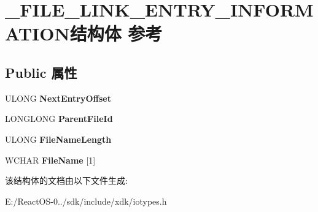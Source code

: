 \hypertarget{struct___f_i_l_e___l_i_n_k___e_n_t_r_y___i_n_f_o_r_m_a_t_i_o_n}{}\section{\+\_\+\+F\+I\+L\+E\+\_\+\+L\+I\+N\+K\+\_\+\+E\+N\+T\+R\+Y\+\_\+\+I\+N\+F\+O\+R\+M\+A\+T\+I\+O\+N结构体 参考}
\label{struct___f_i_l_e___l_i_n_k___e_n_t_r_y___i_n_f_o_r_m_a_t_i_o_n}
\subsection*{Public 属性}
\begin{DoxyCompactItemize}
\item 
\mbox{\label{struct___f_i_l_e___l_i_n_k___e_n_t_r_y___i_n_f_o_r_m_a_t_i_o_n_a804c79ce4b4c49790fd790cfe35675de}} 
U\+L\+O\+NG {\bfseries Next\+Entry\+Offset}
\item 
\mbox{\label{struct___f_i_l_e___l_i_n_k___e_n_t_r_y___i_n_f_o_r_m_a_t_i_o_n_acb264096b24e44b8cf59476f0b30beb0}} 
L\+O\+N\+G\+L\+O\+NG {\bfseries Parent\+File\+Id}
\item 
\mbox{\label{struct___f_i_l_e___l_i_n_k___e_n_t_r_y___i_n_f_o_r_m_a_t_i_o_n_ac4fab2bafc60ef36638d72da5d0d1876}} 
U\+L\+O\+NG {\bfseries File\+Name\+Length}
\item 
\mbox{\label{struct___f_i_l_e___l_i_n_k___e_n_t_r_y___i_n_f_o_r_m_a_t_i_o_n_a2c3c90e3cfc32f2b9e9e6f0e6a9ea6b4}} 
W\+C\+H\+AR {\bfseries File\+Name} \mbox{[}1\mbox{]}
\end{DoxyCompactItemize}


该结构体的文档由以下文件生成\+:\begin{DoxyCompactItemize}
\item 
E\+:/\+React\+O\+S-\/0../sdk/include/xdk/iotypes.\+h\end{DoxyCompactItemize}
